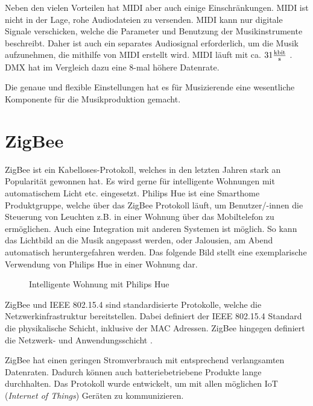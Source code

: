 Neben den vielen Vorteilen hat MIDI aber auch einige Einschränkungen. MIDI ist nicht in der Lage, rohe Audiodateien zu versenden\cite[S. 4]{MIDI-DETAILED-SPECIFICATION}. MIDI kann nur digitale Signale verschicken, welche die Parameter und Benutzung der Musikinstrumente beschreibt. Daher ist auch ein separates Audiosignal erforderlich, um die Musik aufzunehmen, die mithilfe von MIDI erstellt wird. MIDI läuft mit ca. $31 \frac{\SI{}{\kilo\bit}}{\SI{}{\s}}$ \cite[S. 1]{MIDI-DETAILED-SPECIFICATION}. DMX hat im Vergleich dazu eine 8-mal höhere Datenrate. 

Die genaue und flexible Einstellungen hat es für Musizierende eine wesentliche Komponente für die Musikproduktion gemacht.


\section{ZigBee}
ZigBee ist ein Kabelloses-Protokoll, welches in den letzten Jahren stark an Popularität gewonnen hat. Es wird gerne für intelligente Wohnungen mit automatischem Licht etc. eingesetzt. Philips Hue ist eine Smarthome Produktgruppe, welche über das ZigBee Protokoll läuft, um Benutzer/-innen die Steuerung von Leuchten z.B. in einer Wohnung über das Mobiltelefon zu ermöglichen. Auch eine Integration mit anderen Systemen ist möglich. So kann das Lichtbild an die Musik angepasst werden, oder Jalousien, am Abend automatisch heruntergefahren werden. Das folgende Bild stellt eine exemplarische Verwendung von Philips Hue in einer Wohnung dar.

\begin{figure}[H]
	\centering
	\caption{Intelligente Wohnung mit  Philips Hue}
\end{figure}


ZigBee und IEEE 802.15.4 sind standardisierte Protokolle, welche die Netzwerkinfrastruktur bereitstellen. Dabei definiert der IEEE 802.15.4 Standard die physikalische Schicht, inklusive der MAC Adressen. ZigBee hingegen definiert die Netzwerk- und Anwendungsschicht \cite[S.5]{GettingStartedWithZigBee}.

ZigBee hat einen geringen Stromverbrauch mit entsprechend verlangsamten Datenraten. Dadurch können auch batteriebetriebene Produkte lange durchhalten. Das Protokoll wurde entwickelt, um mit allen möglichen IoT (\emph{Internet of Things}) Geräten zu kommunizieren\cite[S.8]{GettingStartedWithZigBee}.


